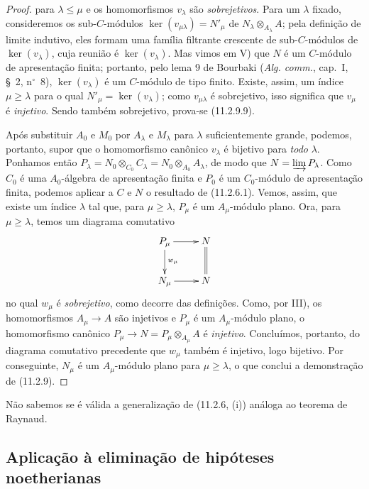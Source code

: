 \begin{proof}

para $\lambda\leq\mu$ e os homomorfismos $v_\lambda$ são \emph{sobrejetivos}.
Para um $\lambda$ fixado, consideremos os sub-$C$-módulos
$\ker(v_{\mu\lambda})=N'_\mu$ de $N_\lambda\otimes_{A_\lambda}A$; pela
definição de limite indutivo, eles formam uma família filtrante crescente
de sub-$C$-módulos de $\ker(v_\lambda)$, cuja reunião é
$\ker(v_\lambda)$. Mas vimos em V) que $N$ é um $C$-módulo de
apresentação finita; portanto, pelo lema 9 de Bourbaki
(\emph{Alg. comm.}, cap.~I, \S~2, n$^\circ$~8),
$\ker(v_\lambda)$ é um $C$-módulo de tipo finito. Existe, assim, um índice
$\mu\geq\lambda$ para o qual $N'_\mu=\ker(v_\lambda)$; como
$v_{\mu\lambda}$ é sobrejetivo, isso significa que $v_\mu$ é
\emph{injetivo}. Sendo também sobrejetivo, prova-se (11.2.9.9).

Após substituir $A_0$ e $M_0$ por $A_\lambda$ e $M_\lambda$ para
$\lambda$ suficientemente grande, podemos, portanto, supor que o
homomorfismo canônico $v_\lambda$ é bijetivo para \emph{todo} $\lambda$.
Ponhamos então
$P_\lambda=N_0\otimes_{C_0}C_\lambda=N_0\otimes_{A_0}A_\lambda$,
de modo que $N=\varinjlim P_\lambda$. Como $C_0$ é uma $A_0$-álgebra
de apresentação finita e $P_0$ é um $C_0$-módulo de apresentação
finita, podemos aplicar a $C$ e $N$ o resultado de (11.2.6.1).
Vemos, assim, que existe um índice $\lambda$ tal que, para
$\mu\geq\lambda$, $P_\mu$ é um $A_\mu$-módulo plano.
Ora, para $\mu\geq\lambda$, temos um diagrama comutativo
\[
\xymatrix{
P_\mu \ar[r] \ar[d]^{w_\mu} & N \ar@{=}[d] \\
N_\mu \ar[r] & N
}
\]
no qual $w_\mu$ é \emph{sobrejetivo}, como decorre das definições.
Como, por III), os homomorfismos $A_\mu\to A$ são injetivos e
$P_\mu$ é um $A_\mu$-módulo plano, o homomorfismo canônico
$P_\mu\to N=P_\mu\otimes_{A_\mu}A$ é \emph{injetivo}.
Concluímos, portanto, do diagrama comutativo precedente que
$w_\mu$ também é injetivo, logo bijetivo. Por conseguinte,
$N_\mu$ é um $A_\mu$-módulo plano para $\mu\geq\lambda$,
o que conclui a demonstração de (11.2.9).
\end{proof}

\begin{remark}[11.2.10]
\label{IV.11.2.10}
Não sabemos se é válida a generalização de (11.2.6, (i))
análoga ao teorema de Raynaud.
\end{remark}

\subsection{Aplicação à eliminação de hipóteses noetherianas}
\label{subsection:IV.11.3}
\label{IV.11.3}

